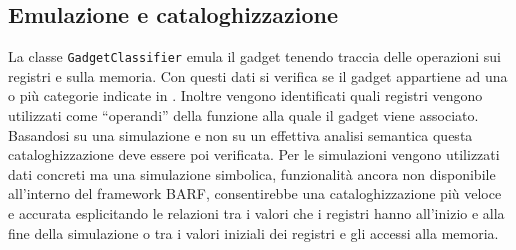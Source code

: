 \subsection{Emulazione e cataloghizzazione}
La classe \lstinline{GadgetClassifier} emula il gadget tenendo traccia
delle operazioni sui registri e sulla memoria. Con questi dati si
verifica se il gadget appartiene ad una o più categorie indicate in
\cite{schwartz-2011}. 
Inoltre vengono identificati quali registri vengono utilizzati come
``operandi'' della funzione alla quale il gadget viene
associato. Basandosi su una simulazione e non su un effettiva analisi
semantica questa cataloghizzazione deve essere poi verificata. Per le
simulazioni vengono utilizzati dati concreti ma una simulazione
simbolica, funzionalità ancora non disponibile all'interno del
framework BARF, consentirebbe una cataloghizzazione più veloce e
accurata esplicitando le relazioni tra i valori che i registri hanno
all'inizio e alla fine della simulazione o tra i valori iniziali dei
registri e gli accessi alla memoria.

